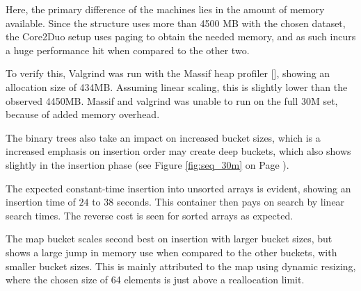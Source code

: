 Here, the primary difference of the machines lies in the amount of memory
available. Since the structure uses more than 4500 MB with the chosen dataset,
the Core2Duo setup uses paging to obtain the needed memory, and as such incurs
a huge performance hit when compared to the other two.

To verify this, Valgrind was run with the Massif heap profiler
[\pageref{fig:Massif_map_30m}], showing an allocation size of 434MB. Assuming
linear scaling, this is slightly lower than the observed 4450MB. Massif and
valgrind was unable to run on the full 30M set, because of added memory
overhead.

The binary trees also take an impact on increased bucket sizes, which
is a increased emphasis on insertion order may create deep buckets, which also
shows slightly in the insertion phase (see Figure \ref{fig:seq_30m} on
Page \pageref{fig:seq_30m}).

The expected constant-time insertion into unsorted arrays is evident, showing
an insertion time of $24$ to $38$ seconds. This container then pays on search
by linear search times. The reverse cost is seen for sorted arrays as expected.

The {\keyword map} bucket scales second best on insertion with larger bucket
sizes, but shows a large jump in memory use when compared to the other buckets,
with smaller bucket sizes. This is mainly attributed to the {\keyword map}
using dynamic resizing, where the chosen size of 64 elements is just above a
reallocation limit.

